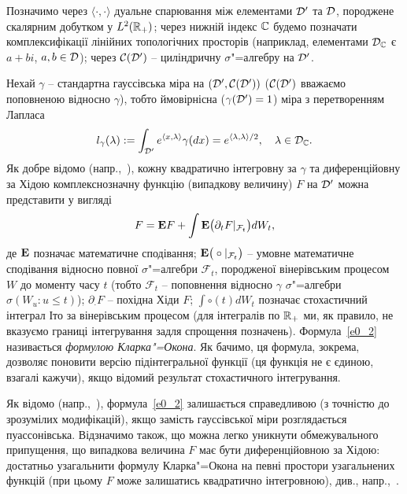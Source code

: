 Позначимо через $\langle\cdot,\cdot\rangle$ дуальне спарювання між елементами $\mathcal{D}'$ та $\mathcal{D}$, породжене скалярним добутком у $L^2(\mathbb{R}_+)$; через нижній індекс $\mathbb{C}$ будемо позначати комплексифікації лінійних топологічних просторів (наприклад, елементами $\mathcal{D}_{\mathbb{C}}$ є $a+bi$, $a,b\in\mathcal{D}$); через $\mathcal{C}(\mathcal{D}')$ -- циліндричну $\sigma$"=алгебру на $\mathcal{D}'$.

Нехай $\gamma$ -- стандартна гауссівська міра на $(\mathcal{D}',\mathcal{C}(\mathcal{D}'))$ ($\mathcal{C}(\mathcal{D}')$ вважаємо поповненою відносно $\gamma$), тобто ймовірнісна ($\gamma(\mathcal{D}')=1$) міра з перетворенням Лапласа
\begin{equation*}
    l_\gamma(\lambda):=\int_{\mathcal{D}'}e^{\langle x,\lambda\rangle}\gamma (dx)
                      = e^{\langle\lambda,\lambda\rangle/2},
                    \quad
    \lambda\in\mathcal{D}_{\mathbb{C}}.
\end{equation*}
Як добре відомо (напр.,~\cite{Cl70,Oc84,Lo99}), кожну квадратично інтегровну за $\gamma$ та диференційовну за Хідою комплекснозначну функцію (випадкову величину) $F$ на $\mathcal{D}'$ можна представити у вигляді
\begin{equation}\label{e0_2}
    F=\mathbf{E} F+\int\mathbf{E}\big(\partial_t F|_{\mathcal F_t}\big)dW_t,
\end{equation}
де $\mathbf{E}$ позначає математичне сподівання; $\mathbf{E}\big(\circ|_{\mathcal F_t}\big)$ -- умовне математичне сподівання відносно повної $\sigma$"=алгебри $\mathcal F_t$, породженої вінерівським процесом $W$ до моменту часу $t$ (тобто $\mathcal F_t$ -- поповнення відносно $\gamma$ $\sigma$"=алгебри $\sigma (W_u:u\leq t)$); $\partial_\cdot F$ -- похідна Хіди $F$; $\int\circ (t)dW_t$ позначає стохастичний інтеграл Іто за вінерівським процесом (для інтегралів по $\mathbb{R}_+$ ми, як правило, не вказуємо границі інтегрування задля спрощення позначень).
Формула~\eqref{e0_2} називається {\it формулою Кларка"=Окона}.
Як бачимо, ця формула, зокрема, дозволяє поновити версію підінтегральної функції (ця функція не є єдиною, взагалі кажучи), якщо відомий результат стохастичного інтегрування.

Як відомо (напр.,~\cite{NOP09,Zh09}), формула~\eqref{e0_2} залишається справедливою (з точністю до зрозумілих модифікацій), якщо замість гауссівської міри розглядається пуассонівська.
Відзначимо також, що можна легко уникнути обмежувального припущення, що випадкова величина $F$ має бути диференційовною за Хідою: достатньо узагальнити формулу Кларка"=Окона на певні простори узагальнених функцій (при цьому $F$ може залишатись квадратично інтегровною), див., напр.,~\cite{FOS00,NOP04}.

